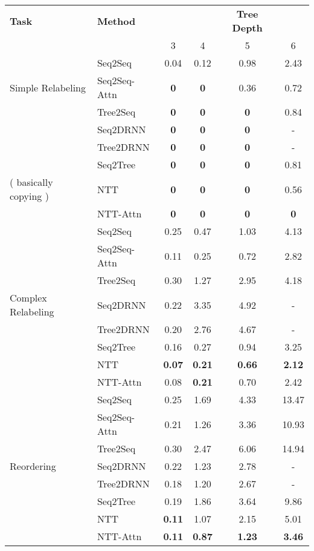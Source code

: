 \begin{table*}[tbh!]
    \centering
    \begin{tabular}{l l|c c c c}
         {\bf Task} & {\bf Method} &  & & {\bf Tree Depth} & \\ 
         & & 3 & 4 & 5 & 6 \\ \hline
         & Seq2Seq & 0.04& 0.12 & 0.98 & 2.43\\
         Simple Relabeling & Seq2Seq-Attn & {\bf 0} & {\bf 0} & 0.36 & 0.72 \\
         & Tree2Seq &  {\bf 0} & {\bf 0} & {\bf 0} & 0.84 \\
         & Seq2DRNN &  {\bf 0} & {\bf 0} & {\bf 0} & - \\
         & Tree2DRNN &  {\bf 0} & {\bf 0} & {\bf 0} & - \\
         & Seq2Tree &  {\bf 0} & {\bf 0} & {\bf 0} & 0.81 \\
         ( basically copying ) & NTT & {\bf 0} & {\bf 0} & {\bf 0} &  0.56 \\
         & NTT-Attn & {\bf 0} & {\bf 0} & {\bf 0} & {\bf 0} \\ \hline
            
         & Seq2Seq & 0.25 & 0.47 & 1.03 & 4.13\\
         & Seq2Seq-Attn & 0.11 & 0.25 & 0.72 & 2.82\\
         & Tree2Seq &  0.30 & 1.27 & 2.95 & 4.18 \\
         Complex Relabeling & Seq2DRNN &  0.22 & 3.35 & 4.92 & - \\
         & Tree2DRNN &  0.20 & 2.76 & 4.67 & - \\
         & Seq2Tree &  0.16 & 0.27 & 0.94 & 3.25 \\
         & NTT & {\bf 0.07} & {\bf 0.21} & {\bf 0.66} & {\bf 2.12}\\ 
         & NTT-Attn &  0.08 & {\bf 0.21} &  0.70 &  2.42 \\ \hline

         
         & Seq2Seq & 0.25 & 1.69 & 4.33 & 13.47\\
          & Seq2Seq-Attn & 0.21 & 1.26 & 3.36 & 10.93 \\
         & Tree2Seq & 0.30 & 2.47 & 6.06 & 14.94 \\
         Reordering & Seq2DRNN &  0.22 & 1.23 & 2.78 & - \\
         & Tree2DRNN &  0.18 & 1.20 & 2.67 & - \\
         & Seq2Tree &  0.19 & 1.86 & 3.64 & 9.86 \\
         & NTT & {\bf 0.11} & 1.07 &  2.15 & 5.01\\
         & NTT-Attn & {\bf 0.11} & {\bf 0.87} &  {\bf 1.23} & {\bf 3.46} \\ \hline


\end{tabular}
\end{table*}
